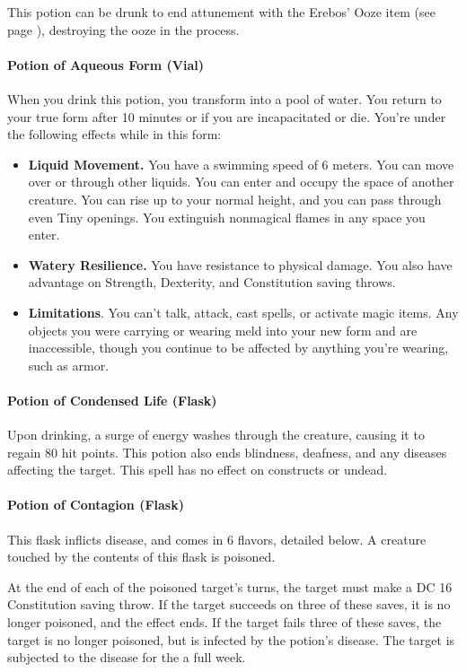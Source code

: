         This potion can be drunk to end attunement with the Erebos' Ooze item (see page \pageref{item::erebosooze}), destroying the ooze in the process.
    \paragraph{Potion of Aqueous Form (Vial)}
        When you drink this potion, you transform into a pool of water.
        You return to your true form after 10 minutes or if you are incapacitated or die.
        You're under the following effects while in this form:
        \begin{itemize}
            \item \textbf{Liquid Movement.} You have a swimming speed of 6 meters.
            You can move over or through other liquids.
            You can enter and occupy the space of another creature.
            You can rise up to your normal height, and you can pass through even Tiny openings.
            You extinguish nonmagical flames in any space you enter.
            \item \textbf{Watery Resilience.} You have resistance to physical damage.
            You also have advantage on Strength, Dexterity, and Constitution saving throws.
            \item \textbf{Limitations}. You can't talk, attack, cast spells, or activate magic items.
            Any objects you were carrying or wearing meld into your new form and are inaccessible, though you continue to be affected by anything you're wearing, such as armor.
        \end{itemize}
    \paragraph{Potion of Condensed Life (Flask)} %
        Upon drinking, a surge of energy washes through the creature, causing it to regain 80 hit points.
        This potion also ends blindness, deafness, and any diseases affecting the target.
        This spell has no effect on constructs or undead.
    \paragraph{Potion of Contagion (Flask)} %
        This flask inflicts disease, and comes in 6 flavors, detailed below.
        A creature touched by the contents of this flask is poisoned.

        At the end of each of the poisoned target's turns, the target must make a DC 16 Constitution saving throw.
        If the target succeeds on three of these saves, it is no longer poisoned, and the effect ends.
        If the target fails three of these saves, the target is no longer poisoned, but is infected by the potion's disease.
        The target is subjected to the disease for the a full week.

